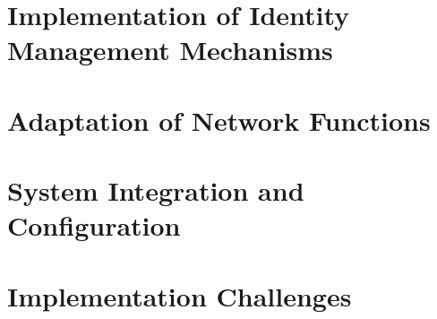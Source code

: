 \section{Implementation of Identity Management Mechanisms}


\section{Adaptation of Network Functions}



\section{System Integration and Configuration}



\section{Implementation Challenges}

